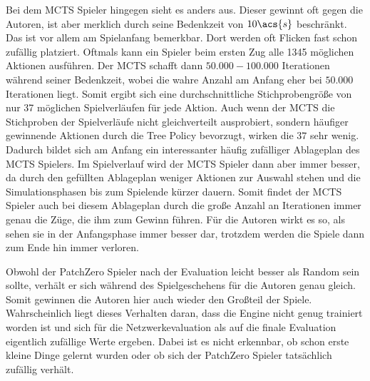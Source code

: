 Bei dem \ac{MCTS} Spieler hingegen sieht es anders aus. Dieser gewinnt oft gegen die Autoren, ist aber merklich durch seine Bedenkzeit von $10\acs{s}$ beschränkt. Das ist vor allem am Spielanfang bemerkbar. Dort werden oft Flicken fast schon zufällig platziert. Oftmals kann ein Spieler beim ersten Zug alle 1345 möglichen Aktionen ausführen. Der \ac{MCTS} schafft dann $50{.}000-100{.}000$ Iterationen während seiner Bedenkzeit, wobei die wahre Anzahl am Anfang eher bei $50{.}000$ Iterationen liegt. Somit ergibt sich eine durchschnittliche Stichprobengröße von nur 37 möglichen Spielverläufen für jede Aktion. Auch wenn der \ac{MCTS} die Stichproben der Spielverläufe nicht gleichverteilt ausprobiert, sondern häufiger gewinnende Aktionen durch die Tree Policy bevorzugt, wirken die $37$ sehr wenig. Dadurch bildet sich am Anfang ein interessanter häufig zufälliger Ablageplan des \ac{MCTS} Spielers. Im Spielverlauf wird der \ac{MCTS} Spieler dann aber immer besser, da durch den gefüllten Ablageplan weniger Aktionen zur Auswahl stehen und die Simulationsphasen bis zum Spielende kürzer dauern. Somit findet der \ac{MCTS} Spieler auch bei diesem Ablageplan durch die große Anzahl an Iterationen immer genau die Züge, die ihm zum Gewinn führen. Für die Autoren wirkt es so, als sehen sie in der Anfangsphase immer besser dar, trotzdem werden die Spiele dann zum Ende hin immer verloren.

Obwohl der PatchZero Spieler nach der Evaluation leicht besser als Random sein sollte, verhält er sich während des Spielgeschehens für die Autoren genau gleich. Somit gewinnen die Autoren hier auch wieder den Großteil der Spiele. Wahrscheinlich liegt dieses Verhalten daran, dass die Engine nicht genug trainiert worden ist und sich für die Netzwerkevaluation als auf die finale Evaluation eigentlich zufällige Werte ergeben. Dabei ist es nicht erkennbar, ob schon erste kleine Dinge gelernt wurden oder ob sich der PatchZero Spieler tatsächlich zufällig verhält.